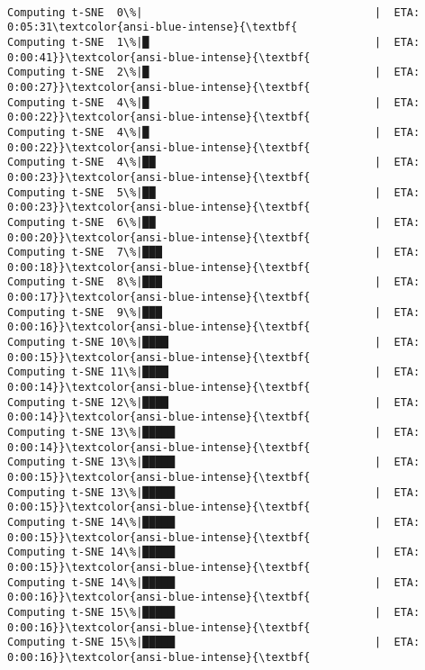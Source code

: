 \documentclass[11pt]{article}
\begin{document}
    \begin{Verbatim}[commandchars=\\\{\}]

Computing t-SNE  0\%|                                    |  ETA: 0:05:31\textcolor{ansi-blue-intense}{\textbf{
Computing t-SNE  1\%|█                                   |  ETA: 0:00:41}}\textcolor{ansi-blue-intense}{\textbf{
Computing t-SNE  2\%|█                                   |  ETA: 0:00:27}}\textcolor{ansi-blue-intense}{\textbf{
Computing t-SNE  4\%|█                                   |  ETA: 0:00:22}}\textcolor{ansi-blue-intense}{\textbf{
Computing t-SNE  4\%|█                                   |  ETA: 0:00:22}}\textcolor{ansi-blue-intense}{\textbf{
Computing t-SNE  4\%|██                                  |  ETA: 0:00:23}}\textcolor{ansi-blue-intense}{\textbf{
Computing t-SNE  5\%|██                                  |  ETA: 0:00:23}}\textcolor{ansi-blue-intense}{\textbf{
Computing t-SNE  6\%|██                                  |  ETA: 0:00:20}}\textcolor{ansi-blue-intense}{\textbf{
Computing t-SNE  7\%|███                                 |  ETA: 0:00:18}}\textcolor{ansi-blue-intense}{\textbf{
Computing t-SNE  8\%|███                                 |  ETA: 0:00:17}}\textcolor{ansi-blue-intense}{\textbf{
Computing t-SNE  9\%|███                                 |  ETA: 0:00:16}}\textcolor{ansi-blue-intense}{\textbf{
Computing t-SNE 10\%|████                                |  ETA: 0:00:15}}\textcolor{ansi-blue-intense}{\textbf{
Computing t-SNE 11\%|████                                |  ETA: 0:00:14}}\textcolor{ansi-blue-intense}{\textbf{
Computing t-SNE 12\%|████                                |  ETA: 0:00:14}}\textcolor{ansi-blue-intense}{\textbf{
Computing t-SNE 13\%|█████                               |  ETA: 0:00:14}}\textcolor{ansi-blue-intense}{\textbf{
Computing t-SNE 13\%|█████                               |  ETA: 0:00:15}}\textcolor{ansi-blue-intense}{\textbf{
Computing t-SNE 13\%|█████                               |  ETA: 0:00:15}}\textcolor{ansi-blue-intense}{\textbf{
Computing t-SNE 14\%|█████                               |  ETA: 0:00:15}}\textcolor{ansi-blue-intense}{\textbf{
Computing t-SNE 14\%|█████                               |  ETA: 0:00:15}}\textcolor{ansi-blue-intense}{\textbf{
Computing t-SNE 14\%|█████                               |  ETA: 0:00:16}}\textcolor{ansi-blue-intense}{\textbf{
Computing t-SNE 15\%|█████                               |  ETA: 0:00:16}}\textcolor{ansi-blue-intense}{\textbf{
Computing t-SNE 15\%|█████                               |  ETA: 0:00:16}}\textcolor{ansi-blue-intense}{\textbf{

\end{Verbatim}
\end{document}
